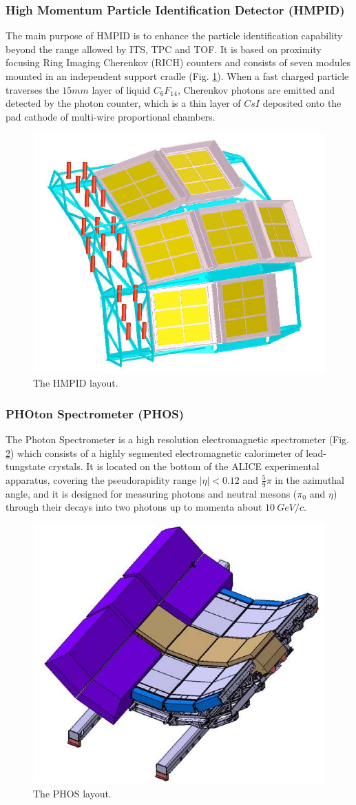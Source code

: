 \subsubsection{High Momentum Particle Identification Detector (HMPID)}
The main purpose of HMPID is to enhance the particle identification capability beyond the range allowed by ITS, TPC and TOF. 
It is based on proximity focusing Ring Imaging Cherenkov (RICH) counters and consists of seven modules mounted in an independent support cradle (Fig. \ref{fig:HMPID}). 
When a fast charged particle traverses the $15 mm$ layer of liquid $C_6F_{14}$, Cherenkov photons are emitted and detected by the photon counter, which is a thin layer of $CsI$ deposited onto the pad cathode of multi-wire proportional chambers.

\begin{figure}[!h]
\begin{center}
\includegraphics[width=0.4\linewidth]{Chapters/Introduction/Figs/hmpid.jpg}
\caption{The HMPID layout.}
\label{fig:HMPID}
\end{center}
\end{figure}

\subsubsection{PHOton Spectrometer (PHOS)}
The Photon Spectrometer is a high resolution electromagnetic spectrometer (Fig. \ref{fig:PHOS}) which consists of a highly segmented electromagnetic calorimeter of lead-tungstate crystals.
It is located on the bottom of the ALICE experimental apparatus, covering the pseudorapidity range $|\eta| < 0.12$ and $\frac{5}{9}\pi$ in the azimuthal angle, and it is designed for measuring photons and neutral mesons ($\pi_0$ and $\eta$) through their decays into two photons up to momenta about $10\ GeV/c$.

\begin{figure}[!h]
\begin{center}
\includegraphics[width=0.5\linewidth]{Chapters/Introduction/Figs/phos.jpg}
\caption{The PHOS layout.}
\label{fig:PHOS}
\end{center}
\end{figure}

